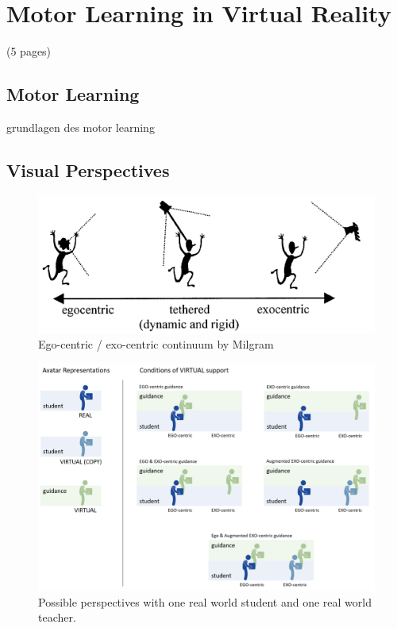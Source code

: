 \chapter{Motor Learning in Virtual Reality}
(5 pages)

\section{Motor Learning}
grundlagen des motor learning
\section{Visual Perspectives}

\begin{figure}[htb]
	\centering
	\includegraphics[width=\textwidth]{figures/ego_exo_continuum.PNG}
	\caption[Ego-Exo continuum by Milgram]{Ego-centric / exo-centric continuum by Milgram }
	\label{fig:ego-exo-continuum}
\end{figure}

\begin{figure}[htb]
	\centering
	\includegraphics[width=\textwidth]{figures/perspectives.png}
	\caption[Possible perspectives]{Possible perspectives with one real world student and one real world teacher.}
	\label{fig:perspectives}
\end{figure}

